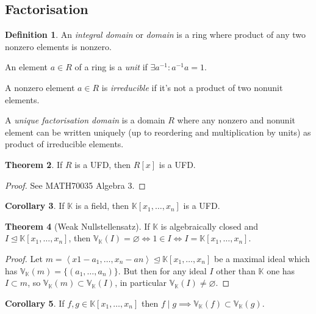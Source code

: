 \documentclass{article}
\newcommand{\K}{\mathbb{K}}
\newcommand{\V}{\mathbb{V}}
\newcommand{\la}{\left\langle}
\newcommand{\ra}{\right\rangle}
\theoremstyle{definition}
\newtheorem{defn}{Definition}[subsection]
\newtheorem{thm}[defn]{Theorem}
\newtheorem{coro}[defn]{Corollary}
\begin{document}
\subsection{Factorisation}
\begin{defn}
An \textit{integral domain} or \textit{domain} is a ring where product of any two nonzero elements is nonzero.

An element $a\in R$ of a ring is a \textit{unit} if $\exists a^{-1}:a^{-1}a=1$.

A nonzero element $a\in R$ is \textit{irreducible} if it's not a product of two nonunit elements.

A \textit{unique factorisation domain} is a domain $R$ where any nonzero and nonunit element can be written uniquely (up to reordering and multiplication by units) as product of irreducible elements.
\end{defn}

\begin{thm}
If $R$ is a UFD, then $R[x]$ is a UFD.
\end{thm}
\begin{proof}
See MATH70035 Algebra 3.
\end{proof}

\begin{coro}
\label{coro:KfieldKxUFD}
If $\K$ is a field, then $\K[x_1,\ldots,x_n]$ is a UFD.
\end{coro}

\begin{thm}[Weak Nullstellensatz]
\label{thm:weak0stellensatz}
If $\K$ is algebraically closed and $I\unlhd\K[x_1,\ldots,x_n]$, then $\V_\K(I)=\varnothing\iff 1\in I\iff I=\K[x_1,\ldots,x_n]$.
\end{thm}
\begin{proof}
Let $m=\la x1-a_1,\ldots,x_n-an\ra\unlhd\K[x_1,\ldots,x_n]$ be a maximal ideal which has $\V_\K(m)=\{(a_1,\ldots,a_n)\}$. But then for any ideal $I$ other than $\K$ one has $I\subset m$, so $\V_\K(m)\subset\V_\K(I)$, in particular $\V_\K(I)\neq\varnothing$.
\end{proof}

\begin{coro}
\label{coro:fdivgthenVfinVg}
If $f,g\in \K[x_1,\ldots,x_n]$ then $f\mid g\implies \V_\K(f)\subset\V_\K(g)$.
\end{coro}
\end{document}
